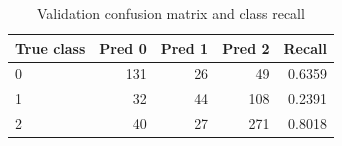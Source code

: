 \begin{table}[htbp]
\centering
\caption{Validation confusion matrix and class recall}
\label{tab:q3_confusion_valid}
\begin{tabular}{lrrrr}
\toprule
True class & Pred 0 & Pred 1 & Pred 2 & Recall \\
\midrule
0 & 131 & 26 & 49 & 0.6359 \\
1 & 32 & 44 & 108 & 0.2391 \\
2 & 40 & 27 & 271 & 0.8018 \\
\bottomrule
\end{tabular}
\end{table}
